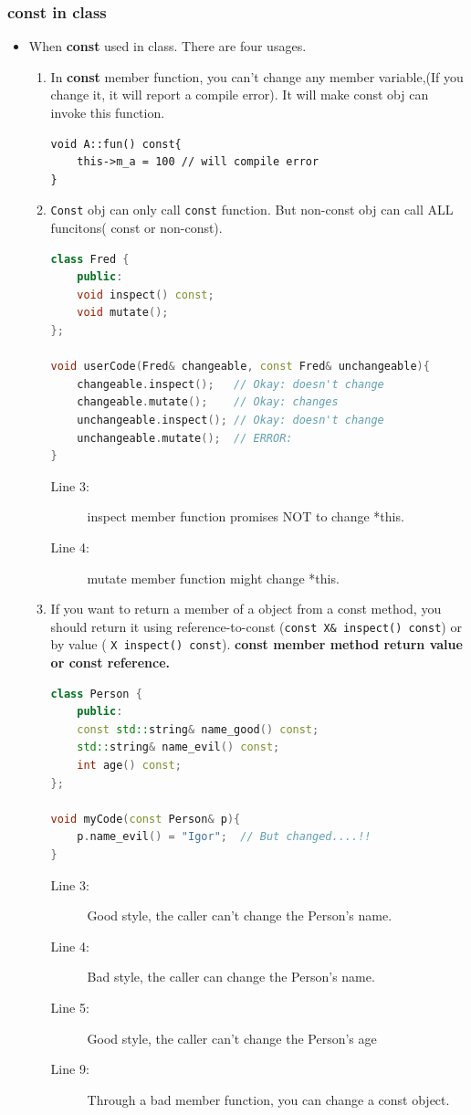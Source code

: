 \documentclass[a4paper,11pt,twoside]{book}
\begin{document}
\subsubsection{const in class}
\begin{itemize}
	
	\item When \textbf{const} used in class. There are four usages.
	\begin{enumerate}
		\item In \textbf{const} member function, you can't change any member variable,(If you change it, it will report a compile error). It will make const obj can invoke this function.
\begin{lstlisting}[numbers=none]
void A::fun() const{
	this->m_a = 100 // will compile error
}
\end{lstlisting}
		
		\item \texttt{Const} obj can only call \texttt{const} function. But non-const obj can call ALL funcitons( const or non-const).
\begin{lstlisting}[frame=single, language=c++, mathescape=true]
class Fred {
	public:
	void inspect() const;
	void mutate();
};

void userCode(Fred& changeable, const Fred& unchangeable){
	changeable.inspect();   // Okay: doesn't change
	changeable.mutate();    // Okay: changes
	unchangeable.inspect(); // Okay: doesn't change
	unchangeable.mutate();  // ERROR:
}
\end{lstlisting}
		\begin{description}
			\item[Line 3:] inspect member function promises NOT to change *this.
			\item[Line 4:] mutate member function might change *this.
		\end{description}
		
		\item If you want to return a member of a object from a const method, you should return it using reference-to-const (\texttt{const X\& inspect() const}) or by value ( \texttt{X inspect() const}). \textbf{const member method return value or const reference.}
\begin{lstlisting}[frame=single, language=c++]
class Person {
	public:
	const std::string& name_good() const;
	std::string& name_evil() const;
	int age() const;
};

void myCode(const Person& p){
	p.name_evil() = "Igor";  // But changed....!!
}
\end{lstlisting}
		\begin{description}
			\item[Line 3:]  Good style, the caller can't change the Person's name.
			\item[Line 4:]  Bad style, the caller can change the Person's name.
			\item[Line 5:]  Good style, the caller can't change the Person's age
			\item[Line 9:]  Through a bad member function, you can change a const object. 
		\end{description}
		

\end{enumerate}
\end{itemize}
\end{document}
